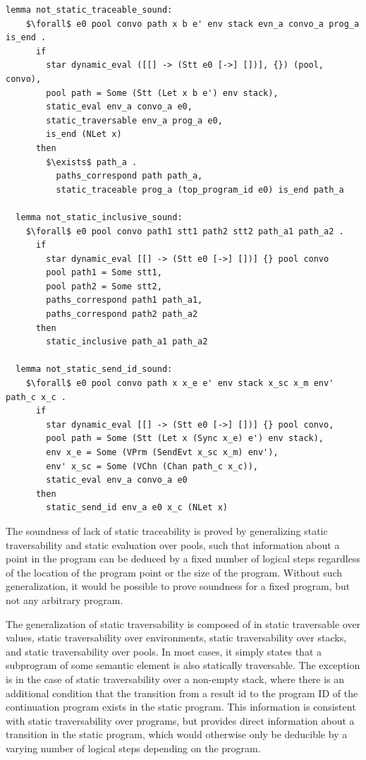 \documentclass{article}
\begin{document}
\begin{lstlisting}[language=logic, mathescape]
  lemma not_static_traceable_sound:
    $\forall$ e0 pool convo path x b e' env stack evn_a convo_a prog_a is_end .
      if
        star dynamic_eval ([[] -> (Stt e0 [->] [])], {}) (pool, convo), 
        pool path = Some (Stt (Let x b e') env stack),
        static_eval env_a convo_a e0,
        static_traversable env_a prog_a e0,
        is_end (NLet x)
      then
        $\exists$ path_a . 
          paths_correspond path path_a, 
          static_traceable prog_a (top_program_id e0) is_end path_a

  lemma not_static_inclusive_sound:
    $\forall$ e0 pool convo path1 stt1 path2 stt2 path_a1 path_a2 . 
      if
        star dynamic_eval [[] -> (Stt e0 [->] [])] {} pool convo
        pool path1 = Some stt1, 
        pool path2 = Some stt2, 
        paths_correspond path1 path_a1, 
        paths_correspond path2 path_a2
      then
        static_inclusive path_a1 path_a2

  lemma not_static_send_id_sound:
    $\forall$ e0 pool convo path x x_e e' env stack x_sc x_m env' path_c x_c .
      if
        star dynamic_eval [[] -> (Stt e0 [->] [])] {} pool convo, 
        pool path = Some (Stt (Let x (Sync x_e) e') env stack), 
        env x_e = Some (VPrm (SendEvt x_sc x_m) env'), 
        env' x_sc = Some (VChn (Chan path_c x_c)), 
        static_eval env_a convo_a e0
      then 
        static_send_id env_a e0 x_c (NLet x)
\end{lstlisting}

The soundness of lack of static traceability is proved by generalizing
static traversability and static evaluation over pools, such that information about a point in
the program can be deduced by a fixed number of logical steps regardless of the location of the
program point or the size of the program. Without such generalization, it would be possible to
prove soundness for a fixed program, but not any arbitrary program.

The generalization of static traversability is composed of in static traversable over values,
static traversability over environments, static traversability over stacks, and static
traversability over pools.
In most cases, it simply states that a subprogram of some semantic element is also statically
traversable. The exception is in the case of
static traversability over a non-empty stack, where
there is an additional condition that the transition
from a result id to the program ID
of the continuation program exists in the static program.
This information is consistent with static
traversability over programs, but provides direct information about a transition in the
static program, which would otherwise only be deducible by a varying number of logical steps
depending on the program.
\end{document}
